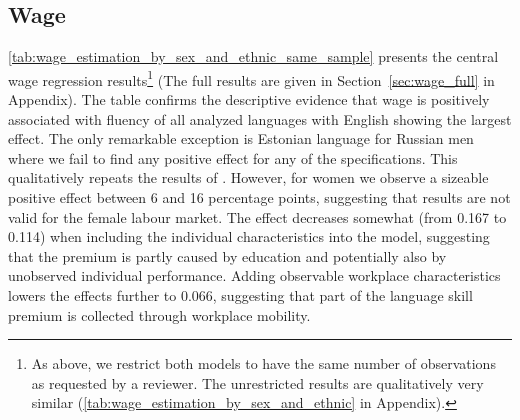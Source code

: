 \documentclass[12pt, a4paper]{article}
\begin{document}
\subsection{Wage}
\label{subsec:basic_model_wage}

\cref{tab:wage_estimation_by_sex_and_ethnic_same_sample} presents the
central wage regression
results\footnote{As above, we
  restrict both models to have the same number of observations as
  requested by a reviewer.  The unrestricted results are qualitatively
  very similar (\cref{tab:wage_estimation_by_sex_and_ethnic} in
  Appendix).}
(The full results are given in Section~\ref{sec:wage_full} in Appendix).
The table
confirms the descriptive evidence that wage is positively associated
with fluency of all analyzed languages with English showing the
largest effect.  The only remarkable exception is
Estonian language for Russian men where we fail to find any positive
effect for any of the specifications.  This qualitatively repeats the results of
\citet{Toomet2011}. However, for women we observe a sizeable
positive effect between 6 and 16 percentage points, suggesting that
\citet{Toomet2011} results are not valid for the female labour market.  The effect decreases somewhat
(from 0.167 to 0.114) when including the individual characteristics
into the model, suggesting that the premium
is partly caused by education and potentially also by unobserved
individual performance.  Adding observable workplace characteristics
lowers the effects further to 0.066, suggesting that part of the
language skill premium is collected through workplace mobility.
\end{document}

